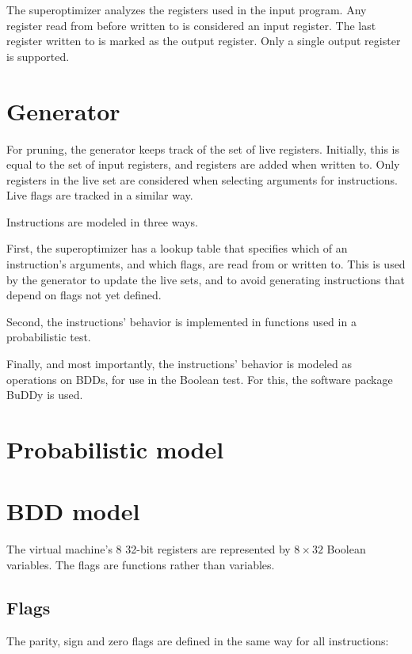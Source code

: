 \documentclass[a4paper,11pt]{kth-mag}
\begin{document}
The superoptimizer analyzes the registers used in the input program.
Any register read from before written to is considered an input register.
The last register written to is marked as the output register.
Only a single output register is supported.

\section{Generator}

For pruning, the generator keeps track of the set of live registers.
Initially, this is equal to the set of input registers, and registers are added when written to.
Only registers in the live set are considered when selecting arguments for instructions.
Live flags are tracked in a similar way.


Instructions are modeled in three ways.

First, the superoptimizer has a lookup table that specifies which of an instruction's arguments, and which flags, are read from or written to.
This is used by the generator to update the live sets, and to avoid generating instructions that depend on flags not yet defined.

Second, the instructions' behavior is implemented in functions used in a probabilistic test.

Finally, and most importantly, the instructions' behavior is modeled as operations on BDDs, for use in the Boolean test.
For this, the software package BuDDy \cite{buddy} is used.

\section{Probabilistic model}

\section{BDD model}

The virtual machine's 8 32-bit registers are represented by $8 \times 32$ Boolean variables. %
The flags are functions rather than variables.

\subsection{Flags}

The parity, sign and zero flags are defined in the same way for all instructions:
\end{document}
